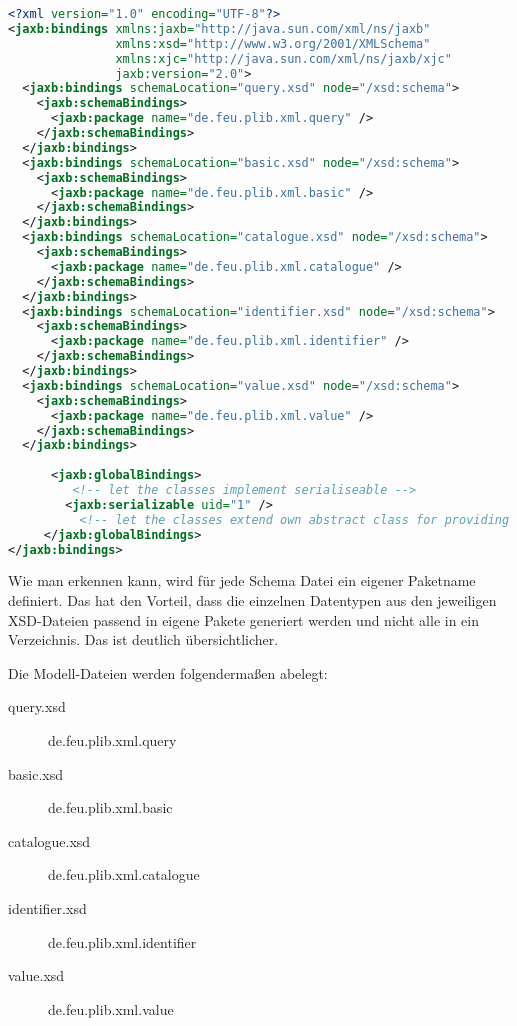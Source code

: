 \begin{lstlisting}[caption=Binding File binding.xjc, language=XML, label=lst:bindingfile]
<?xml version="1.0" encoding="UTF-8"?>
<jaxb:bindings xmlns:jaxb="http://java.sun.com/xml/ns/jaxb"
               xmlns:xsd="http://www.w3.org/2001/XMLSchema"
               xmlns:xjc="http://java.sun.com/xml/ns/jaxb/xjc"
               jaxb:version="2.0">
  <jaxb:bindings schemaLocation="query.xsd" node="/xsd:schema">
    <jaxb:schemaBindings>
      <jaxb:package name="de.feu.plib.xml.query" />
    </jaxb:schemaBindings>
  </jaxb:bindings>
  <jaxb:bindings schemaLocation="basic.xsd" node="/xsd:schema">
    <jaxb:schemaBindings>
      <jaxb:package name="de.feu.plib.xml.basic" />
    </jaxb:schemaBindings>
  </jaxb:bindings>
  <jaxb:bindings schemaLocation="catalogue.xsd" node="/xsd:schema">
    <jaxb:schemaBindings>
      <jaxb:package name="de.feu.plib.xml.catalogue" />
    </jaxb:schemaBindings>
  </jaxb:bindings>
  <jaxb:bindings schemaLocation="identifier.xsd" node="/xsd:schema">
    <jaxb:schemaBindings>
      <jaxb:package name="de.feu.plib.xml.identifier" />
    </jaxb:schemaBindings>
  </jaxb:bindings>
  <jaxb:bindings schemaLocation="value.xsd" node="/xsd:schema">
    <jaxb:schemaBindings>
      <jaxb:package name="de.feu.plib.xml.value" />
    </jaxb:schemaBindings>
  </jaxb:bindings> 
  
      <jaxb:globalBindings>
         <!-- let the classes implement serialiseable -->
        <jaxb:serializable uid="1" />
          <!-- let the classes extend own abstract class for providing some extra functionality for each one -->
     </jaxb:globalBindings>  
</jaxb:bindings> 
\end{lstlisting}

Wie man erkennen kann, wird für jede Schema Datei ein eigener Paketname definiert. Das hat den Vorteil, dass die einzelnen Datentypen aus den jeweiligen XSD-Dateien passend in eigene Pakete generiert werden und nicht alle in ein Verzeichnis. Das ist deutlich übersichtlicher. 

Die Modell-Dateien werden folgendermaßen abelegt:

\begin{description}
\item[query.xsd] de.feu.plib.xml.query
\item[basic.xsd] de.feu.plib.xml.basic
\item[catalogue.xsd] de.feu.plib.xml.catalogue
\item[identifier.xsd] de.feu.plib.xml.identifier
\item[value.xsd] de.feu.plib.xml.value
\end{description}

